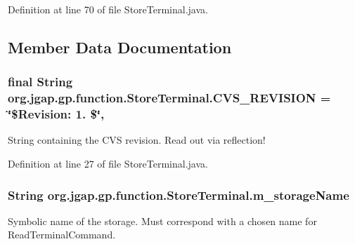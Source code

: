 Definition at line 70 of file Store\-Terminal.\-java.



\subsection{Member Data Documentation}
\hypertarget{classorg_1_1jgap_1_1gp_1_1function_1_1_store_terminal_a10572bd373748d70d4379d84baaa1274}{
\subsubsection[{C\-V\-S\-\_\-\-R\-E\-V\-I\-S\-I\-O\-N}]{\setlength{\rightskip}{0pt plus 5cm}final String org.\-jgap.\-gp.\-function.\-Store\-Terminal.\-C\-V\-S\-\_\-\-R\-E\-V\-I\-S\-I\-O\-N = \char`\"{}\$Revision\-: 1. \$\char`\"{}\hspace{0.3cm}{\ttfamily [static]}, {\ttfamily [private]}}}\label{classorg_1_1jgap_1_1gp_1_1function_1_1_store_terminal_a10572bd373748d70d4379d84baaa1274}
String containing the C\-V\-S revision. Read out via reflection! 

Definition at line 27 of file Store\-Terminal.\-java.

\hypertarget{classorg_1_1jgap_1_1gp_1_1function_1_1_store_terminal_ab899823ec1e32ebe43d6a8ba92799ca9}{
\subsubsection[{m\-\_\-storage\-Name}]{\setlength{\rightskip}{0pt plus 5cm}String org.\-jgap.\-gp.\-function.\-Store\-Terminal.\-m\-\_\-storage\-Name\hspace{0.3cm}{\ttfamily [private]}}}\label{classorg_1_1jgap_1_1gp_1_1function_1_1_store_terminal_ab899823ec1e32ebe43d6a8ba92799ca9}
Symbolic name of the storage. Must correspond with a chosen name for Read\-Terminal\-Command. 

